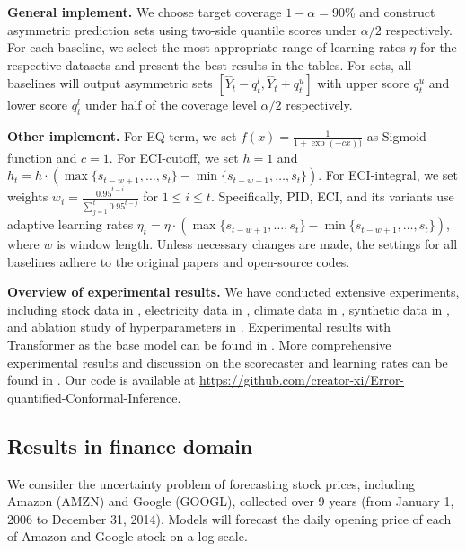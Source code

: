 \textbf{General implement.}
We choose target coverage $1-\alpha=90\%$ and construct asymmetric prediction sets using two-side quantile scores under $\alpha/2$ respectively. For each baseline, we select the most appropriate range of learning rates $\eta$ for the respective datasets and present the best results in the tables. For sets, all baselines will output asymmetric sets $[\hat{Y}_t-q^l_t, \hat{Y}_t+q^u_t]$ with upper score $q^u_t$ and lower score $q^l_t$ under half of the coverage level $\alpha/2$ respectively.

\textbf{Other implement.}
For EQ term, we set $f(x)=\frac{1}{1+\exp{(-cx))}}$ as Sigmoid function and $c=1$. For ECI-cutoff, we set $h=1$ and $h_t = h \cdot (\max\{s_{t-w+1}, \dots, s_t\} - \min\{s_{t-w+1}, \dots, s_t\})$. For ECI-integral, we set weights $w_i=\frac{0.95^{t-i}}{\sum_{j=1}^t0.95^{t-j}}$ for $1\leq i \leq t$. Specifically, PID, ECI, and its variants use adaptive learning rates $\eta_t = \eta \cdot (\max\{s_{t-w+1}, \dots, s_t\} - \min\{s_{t-w+1}, \dots, s_t\})$, where $w$ is window length. Unless necessary changes are made, the settings for all baselines adhere to the original papers and open-source codes.

\textbf{Overview of experimental results.}
We have conducted extensive experiments, including stock data in , electricity data in , climate data in , synthetic data in , and ablation study of hyperparameters in . Experimental results with Transformer as the base model can be found in . More comprehensive experimental results and discussion on the scorecaster and learning rates can be found in . Our code is available at \url{https://github.com/creator-xi/Error-quantified-Conformal-Inference}.


\subsection{Results in finance domain}
\vspace{-0.5em}
\label{results in finance domain}
We consider the uncertainty problem of forecasting stock prices, including Amazon (AMZN) and Google (GOOGL), collected over 9 years (from January 1, 2006 to December 31, 2014). Models will forecast the daily opening price of each of Amazon and Google stock on a log scale. 

